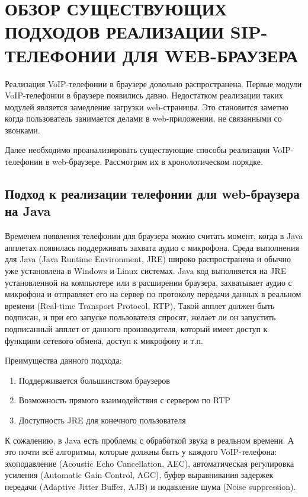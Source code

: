\chapter{ОБЗОР СУЩЕСТВУЮЩИХ ПОДХОДОВ РЕАЛИЗАЦИИ SIP-ТЕЛЕФОНИИ ДЛЯ WEB-БРАУЗЕРА}
\label{chapter:analysis}

Реализация VoIP-телефонии в браузере довольно распространена. Первые модули VoIP-телефонии в браузере появились давно. Недостатком реализации таких модулей является замедление загрузки web-страницы. Это становится заметно когда пользователь занимается делами в web-приложении, не связанными со звонками.

Далее необходимо проанализировать существующие способы реализации VoIP-телефонии в web-браузере. Рассмотрим их в хронологическом порядке.

\section{Подход к реализации телефонии для web-браузера на Java}

Временем появления телефонии для браузера можно считать момент, когда в Java апплетах появилась поддерживать захвата аудио с микрофона. Среда выполнения для Java (Java Runtime Environment, JRE) широко распространена и обычно уже установлена в Windows и Linux системах.\cite{webrtc_flash_java} Java код выполняется на JRE установленной на компьютере или в расширении браузера, захватывает аудио с микрофона и отправляет его на сервер по протоколу передачи данных в реальном времени (Real-time Transport Protocol, RTP). Такой апплет должен быть подписан, и при его запуске пользователя спросят, желает ли он запустить подписанный апплет от данного производителя, который имеет доступ к функциям сетевого обмена, доступ к микрофону и т.п.

Преимущества данного подхода:
\begin{enumerate}
\item Поддерживается большинством браузеров
\item Возможность прямого взаимодействия с сервером по RTP
\item Доступность JRE для конечного пользователя
\end{enumerate}

К сожалению, в Java есть проблемы с обработкой звука в реальном времени. А это почти всё алгоритмы, которые должны быть у каждого VoIP-телефона: эхоподавление (Acoustic Echo Cancellation, AEC), автоматическая регулировка усиления (Automatic Gain Control, AGC), буфер выравнивания задержек передачи (Adaptive Jitter Buffer, AJB) и подавление шума (Noise suppression).

